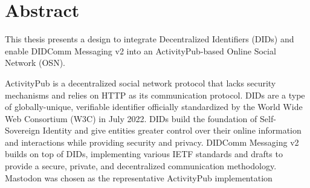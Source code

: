 \chapter*{Abstract}
\label{cha:abstract}

This thesis presents a design to integrate Decentralized Identifiers (DIDs) and enable DIDComm Messaging v2 into an ActivityPub-based Online Social Network (OSN). 

ActivityPub is a decentralized social network protocol that lacks security mechanisms and relies on HTTP as its communication protocol.  
DIDs are a type of globally-unique, verifiable identifier officially standardized by the World Wide Web Consortium (W3C) in July 2022. DIDs build the foundation of Self-Sovereign Identity and give entities greater control over their online information and interactions while providing security and privacy. DIDComm Messaging v2 builds on top of DIDs, implementing various IETF standards and drafts to provide a secure, private, and decentralized communication methodology. 
Mastodon was chosen as the representative ActivityPub implementation